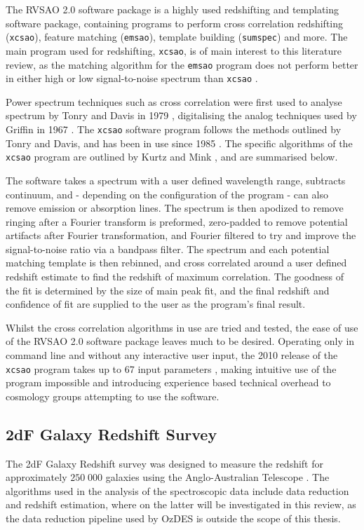 \documentclass[titlesmallcaps, examinerscopy, copyrightpage]{uqthesis}
\begin{document}
The RVSAO 2.0 software package is a highly used redshifting and templating software package, containing programs to perform cross correlation redshifting (\verb+xcsao+), feature matching (\verb+emsao+), template building (\verb+sumspec+) and more. The main program used for redshifting, \verb+xcsao+, is of main interest to this literature review, as the matching algorithm for the \verb+emsao+ program does not perform better in either high or low signal-to-noise spectrum than \verb+xcsao+ \cite{kurtz1998rvsao}.

Power spectrum techniques such as cross correlation were first used to analyse spectrum by Tonry and Davis in 1979 \cite{tonry1979survey}, digitalising the analog techniques used by Griffin in 1967 \cite{griffin1967photoelectric}. The \verb+xcsao+ software program follows the methods outlined by Tonry and Davis, and has been in use since 1985 \cite{kurtz1998rvsao}. The specific algorithms of the \verb+xcsao+ program are outlined by Kurtz and Mink \cite{kurtz1998rvsao}, and are summarised below.

The software takes a spectrum with a user defined wavelength range, subtracts continuum, and - depending on the configuration of the program - can also remove emission or absorption lines. The spectrum is then apodized to remove ringing after a Fourier transform is preformed, zero-padded to remove potential artifacts after Fourier transformation, and Fourier filtered to try and improve the signal-to-noise ratio via a bandpass filter. The spectrum and each potential matching template is then rebinned, and cross correlated around a user defined redshift estimate to find the redshift of maximum correlation. The goodness of the fit is determined by the size of main peak fit, and the final redshift and confidence of fit are supplied to the user as the program's final result.

Whilst the cross correlation algorithms in use are tried and tested, the ease of use of the RVSAO 2.0 software package leaves much to be desired. Operating only in command line and without any interactive user input, the 2010 release of the \verb+xcsao+ program takes up to 67 input parameters \cite{parameters}, making intuitive use of the program impossible and introducing experience based technical overhead to cosmology groups attempting to use the software.

\subsection{2dF Galaxy Redshift Survey}
The 2dF Galaxy Redshift survey was designed to measure the redshift for approximately $250\;000$ galaxies using the Anglo-Australian Telescope \cite{colless20012df}. The algorithms used in the analysis of the spectroscopic data include data reduction and redshift estimation, where on the latter will be investigated in this review, as the data reduction pipeline used by OzDES is outside the scope of this thesis.
\end{document}

